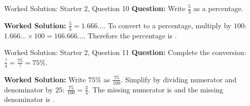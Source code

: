 \documentclass{beamer}
\newcommand{\ablank}[1]{%
  \alt<2>{\textcolor{red}{#1}}{\underline{\phantom{#1}}}%
}
\begin{document}
\begin{frame}[t]{Worked Solution: Starter 2, Question 10}
\textbf{Question:} Write \(\frac{5}{3}\) as a percentage.

\smallskip
\textbf{Worked Solution:} \(\frac{5}{3} = 1.666\ldots\). To convert to a percentage, multiply by \(100\): \(1.666\ldots \times 100 = 166.666\ldots\). Therefore the percentage is \ablank{$166.\dot{6}\%$}.
\end{frame}

\begin{frame}[t]{Worked Solution: Starter 2, Question 11}
\textbf{Question:} Complete the conversion: \(\frac{?}{4} = \frac{75}{?} = 75\%\).

\smallskip
\textbf{Worked Solution:} Write \(75\%\) as \(\frac{75}{100}\). Simplify by dividing numerator and denominator by \(25\): \(\frac{75}{100} = \frac{3}{4}\). The missing numerator is \ablank{$3$} and the missing denominator is \ablank{$100$}.
\end{frame}
\end{document}
